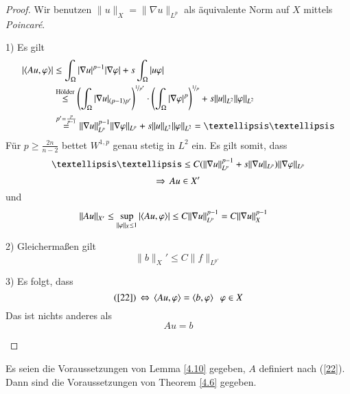 \begin{proof}
    Wir benutzen $\|u\|_X=\|\nabla u \|_{L^p}$ als äquivalente Norm auf $X$ mittels \textit{Poincaré}.
    \begin{description}
        \item{1)}
        Es gilt
        \begin{align*}
            |\lal Au,\vp \ral| &\leq \int_\Omega |\nabla u |^{p-1}|\nabla \vp| + s\int_\Omega |u\vp|\\
            &\overset{\text{Hölder}}{\leq} \left( \int_\Omega |\nabla u|_{(p-1)p'} \right)^{\nicefrac1{p'}}
            \cdot \left( \int_\Omega |\nabla \vp|^p \right)^{\nicefrac 1p} + s \|u\|_{L^2}\|\vp\|_{L^2}\\
            &\overset{p'=\frac{p}{p-1}}{=} \|\nabla u\|_{L^p}^{p-1} \|\nabla \vp\|_{L^p} +
            s \|u\|_{L^2}\|\vp\|_{L^2}= ……
        \end{align*}
        Für $p\geq \frac{2n}{n-2}$ bettet $W^{1,p}$ genau stetig in $L^2$ ein. Es gilt somit, dass
        \[
            ……\leq C (\|\nabla u \|_{L^p}^{p-1}+s\|\nabla u\|_{L^p})\|\nabla\vp\|_{L^p}
        \]
        \[
            \Rightarrow \, Au\in X'
        \]
        und
        \begin{align*}
            \|Au\|_{X'}&\leq \sup_{\|\varphi\|_X\leq1} |\langle Au,\varphi \rangle| \leq C \|\nabla u\|_{L^p}^{p-1}
            =C\|\nabla u\|_X^{p-1}
        \end{align*}
        \item{2)}
        Gleichermaßen gilt
        \[
            \|b\|_X' \leq C\|f\|_{L^{p'}}
        \]
        \item{3)}
        Es folgt, dass
        \[
            (\ref{22}) \, \Leftrightarrow \, \langle Au,\varphi\rangle= \langle b,\varphi\rangle \hspace{.25cm} \varphi \in X
        \]
        Das ist nichts anderes als
        \[
            Au=b
        \]
    \end{description}\[ \]
\end{proof}

\begin{lem}\label{4.11}
    Es seien die Voraussetzungen von Lemma \ref{4.10} gegeben, $A$ definiert nach (\ref{22}). Dann sind
    die Voraussetzungen von Theorem \ref{4.6} gegeben.
\end{lem}


